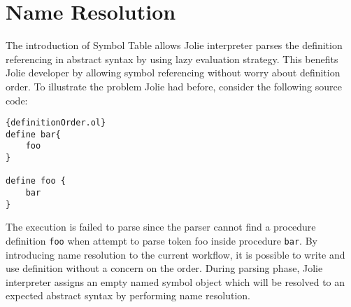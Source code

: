
\section{ Name Resolution }

The introduction of Symbol Table allows Jolie interpreter parses the definition referencing in abstract syntax by using lazy evaluation strategy. This benefits Jolie developer by allowing symbol referencing without worry about definition order. To illustrate the problem Jolie had before, consider the following source code:
\begin{listing}[ht]
    \lstset{language=Jolie,
        style=codeStyle
    }
    \begin{lstlisting}[frame=tlrb]{definitionOrder.ol}
define bar{
    foo
}

define foo {
    bar
}
\end{lstlisting}
\end{listing}

The execution is failed to parse since the parser cannot find a procedure definition \texttt{foo} when attempt to parse token foo inside procedure \texttt{bar}.
By introducing name resolution to the current workflow, it is possible to write and use definition without a concern on the order. During parsing phase, Jolie interpreter assigns an empty named symbol object which will be resolved to an expected abstract syntax by performing name resolution.
